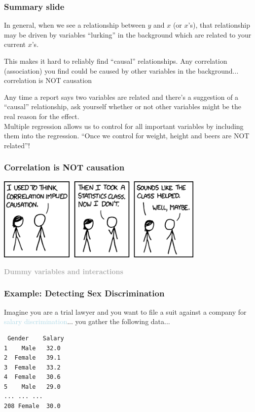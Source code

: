 \documentclass{beamer}
\newcommand{\lb}[1]{\textcolor{lightblue}{#1}}
\newcommand{\dg}[1]{\textcolor{darkgray}{#1}}
\newcommand{\sk}{\vspace{.5cm}}
\begin{document}
\begin{frame}
\frametitle{Summary slide}

In general, when we see a relationship between $y$ and $x$ (or $x$'s), that relationship may be driven by variables ``lurking'' in the background which are related to your current $x$'s.

\sk
This makes it hard to reliably find {\color{lightblue}``causal''} relationships. Any correlation (association) you find could be caused by other variables in the background... 
{\color{burntorange}correlation is NOT causation}

\sk 
Any time a report says two variables are related and there's a suggestion of a {\color{lightblue}``causal''} relationship, ask yourself whether or not other variables might be the real reason for the effect. \\ \sk Multiple regression allows us to {\color{burntorange}control} for all important variables by including them into the regression. {\color{burntorange}``Once we control for weight, height and beers are NOT related''!} 
\end{frame}


\begin{frame}
\frametitle{Correlation is NOT causation}
\begin{center}
\includegraphics[width=4in]{figures/xkcd.png}
\end{center}
\end{frame}


\begin{frame}
\sk\sk
	\dg{\bf Dummy variables and interactions }
\end{frame}




\begin{frame}[containsverbatim]
\frametitle{Example: Detecting Sex Discrimination} 
Imagine you are a trial lawyer and you want to file a suit against a company for \lb{salary discrimination}... you gather the following data... 

\sk
\begin{verbatim}
 Gender    Salary
1    Male   32.0
2  Female   39.1
3  Female   33.2
4  Female   30.6
5    Male   29.0
... ... ... 
208	Female  30.0
\end{verbatim}


\end{frame}
\end{document}
